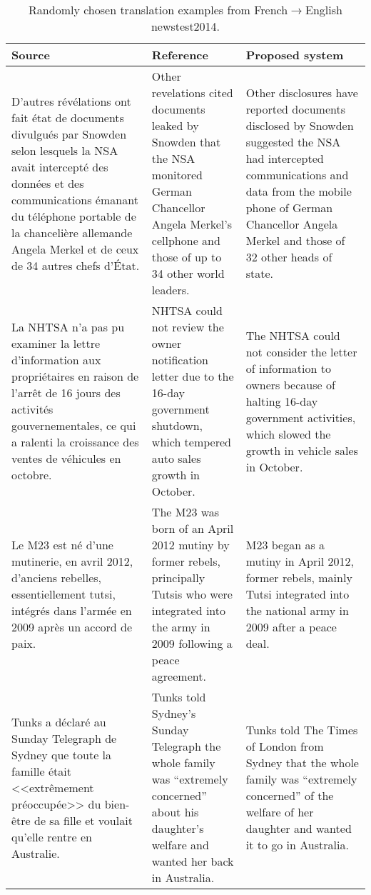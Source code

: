 \documentclass[11pt,a4paper]{article}
\begin{document}
\begin{table*}[t]
\begin{small}
\begin{center}
  \begin{tabular}{p{4.8cm}p{4.8cm}p{4.8cm}}
    \toprule
    \bf Source & \bf Reference & \bf Proposed system \\
    \midrule
    D'autres révélations ont fait état de documents divulgués par Snowden selon lesquels la NSA avait intercepté des données et des communications émanant du téléphone portable de la chancelière allemande Angela Merkel et de ceux de 34 autres chefs d'État. & Other revelations cited documents leaked by Snowden that the NSA monitored German Chancellor Angela Merkel's cellphone and those of up to 34 other world leaders. & Other disclosures have reported documents disclosed by Snowden suggested the NSA had intercepted communications and data from the mobile phone of German Chancellor Angela Merkel and those of 32 other heads of state. \\
    \midrule
	La NHTSA n'a pas pu examiner la lettre d'information aux propriétaires en raison de l'arrêt de 16 jours des activités gouvernementales, ce qui a ralenti la croissance des ventes de véhicules en octobre. & NHTSA could not review the owner notification letter due to the 16-day government shutdown, which tempered auto sales growth in October. & The NHTSA could not consider the letter of information to owners because of halting 16-day government activities, which slowed the growth in vehicle sales in October. \\
    \midrule
    Le M23 est né d'une mutinerie, en avril 2012, d'anciens rebelles, essentiellement tutsi, intégrés dans l'armée en 2009 après un accord de paix. & The M23 was born of an April 2012 mutiny by former rebels, principally Tutsis who were integrated into the army in 2009 following a peace agreement. & M23 began as a mutiny in April 2012, former rebels, mainly Tutsi integrated into the national army in 2009 after a peace deal. \\
    \midrule
	Tunks a déclaré au Sunday Telegraph de Sydney que toute la famille était <<extrêmement préoccupée>> du bien-être de sa fille et voulait qu'elle rentre en Australie. & Tunks told Sydney's Sunday Telegraph the whole family was ``extremely concerned'' about his daughter's welfare and wanted her back in Australia. & Tunks told The Times of London from Sydney that the whole family was ``extremely concerned'' of the welfare of her daughter and wanted it to go in Australia. \\
    \bottomrule
  \end{tabular}
\end{center}
\end{small}
\caption{Randomly chosen translation examples from French$\rightarrow$English newstest2014.} \label{tab:examples}
\end{table*}
\end{document}
